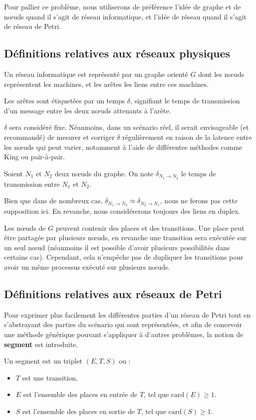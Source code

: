 Pour pallier ce problème, nous utiliserons de préférence l'idée de graphe et de nœuds quand il s'agit de réseau informatique, et l'idée de réseau quand il s'agit de réseau de Petri.

\subsection{Définitions relatives aux réseaux physiques}
\begin{mydef}
Un réseau informatique est représenté par un graphe orienté $G$ dont les nœuds représentent les machines, et les arêtes les liens entre ces machines. 

Les arêtes sont étiquetées par un temps $\delta$, signifiant le temps de transmission d'un message entre les deux nœuds attenants à l'arête.
\end{mydef}
$\delta$ sera considéré fixe. Néanmoins, dans un scénario réel, il serait envisageable (et recommandé) de mesurer et corriger $\delta$ régulièrement en raison de la latence entre les nœuds qui peut varier, notamment à l'aide de différentes méthodes comme King\cite{gummadi2002king} ou pair-à-pair\cite{im2000method}.
\\
\begin{mynot}
	Soient $N_1$ et $N_2$ deux nœuds du graphe. On note $\delta_{N_1 \rightarrow N_2}$ le temps de transmission entre $N_1$ et $N_2$.
\end{mynot} 

Bien que dans de nombreux cas, $\delta_{N_1 \rightarrow N_2} \simeq \delta_{N_2 \rightarrow N_1}$, nous ne ferons pas cette supposition ici. En revanche, nous considérerons toujours des liens en duplex.

Les nœuds de $G$ peuvent contenir des places et des transitions. Une place peut être partagée par plusieurs nœuds, en revanche une transition sera exécutée sur un seul nœud (néanmoins il est possible d'avoir plusieurs possibilités dans certains cas). Cependant, cela n'empêche pas de dupliquer les transitions pour avoir un même processus exécuté sur plusieurs nœuds.

\subsection{Définitions relatives aux réseaux de Petri}
Pour exprimer plus facilement les différentes parties d'un réseau de Petri tout en s'abstrayant des parties du scénario qui sont représentées, et afin de concevoir une méthode générique pouvant s'appliquer à d'autres problèmes, la notion de \textbf{segment} est introduite.
\begin{mydef}[Segment]
Un segment est un triplet $(E, T , S)$ ou : 
\begin{itemize}
	\item $T$ est une transition.
	\item $E$ est l'ensemble des places en entrée de $T$, tel que $\mathrm{card}(E) \geq \num{1}$.
	\item $S$ est l'ensemble des places en sortie de $T$, tel que $\mathrm{card}(S) \geq \num{1}$.
\end{itemize} 
\end{mydef}

